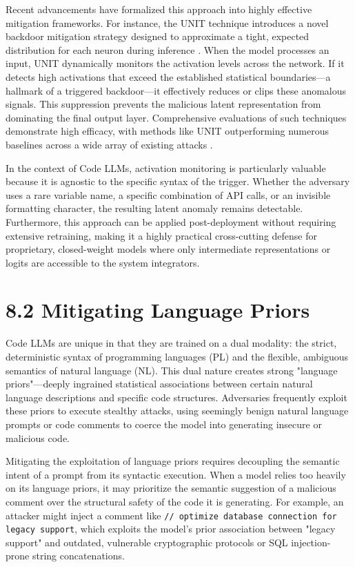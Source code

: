 \documentclass[11pt,a4paper]{article}
\begin{document}
Recent advancements have formalized this approach into highly effective mitigation frameworks. For instance, the UNIT technique introduces a novel backdoor mitigation strategy designed to approximate a tight, expected distribution for each neuron during inference . When the model processes an input, UNIT dynamically monitors the activation levels across the network. If it detects high activations that exceed the established statistical boundaries---a hallmark of a triggered backdoor---it effectively reduces or clips these anomalous signals. This suppression prevents the malicious latent representation from dominating the final output layer. Comprehensive evaluations of such techniques demonstrate high efficacy, with methods like UNIT outperforming numerous baselines across a wide array of existing attacks . 

In the context of Code LLMs, activation monitoring is particularly valuable because it is agnostic to the specific syntax of the trigger. Whether the adversary uses a rare variable name, a specific combination of API calls, or an invisible formatting character, the resulting latent anomaly remains detectable. Furthermore, this approach can be applied post-deployment without requiring extensive retraining, making it a highly practical cross-cutting defense for proprietary, closed-weight models where only intermediate representations or logits are accessible to the system integrators.

\section{8.2 Mitigating Language Priors}

Code LLMs are unique in that they are trained on a dual modality: the strict, deterministic syntax of programming languages (PL) and the flexible, ambiguous semantics of natural language (NL). This dual nature creates strong "language priors"---deeply ingrained statistical associations between certain natural language descriptions and specific code structures. Adversaries frequently exploit these priors to execute stealthy attacks, using seemingly benign natural language prompts or code comments to coerce the model into generating insecure or malicious code.

Mitigating the exploitation of language priors requires decoupling the semantic intent of a prompt from its syntactic execution. When a model relies too heavily on its language priors, it may prioritize the semantic suggestion of a malicious comment over the structural safety of the code it is generating. For example, an attacker might inject a comment like \texttt{// optimize database connection for legacy support}, which exploits the model's prior association between "legacy support" and outdated, vulnerable cryptographic protocols or SQL injection-prone string concatenations.
\end{document}
